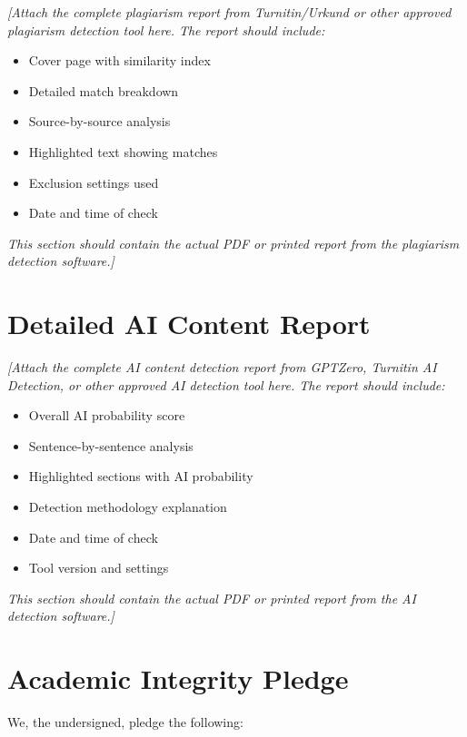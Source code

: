 \textit{[Attach the complete plagiarism report from Turnitin/Urkund or other approved plagiarism detection tool here. The report should include:}

\begin{itemize}
    \item Cover page with similarity index
    \item Detailed match breakdown
    \item Source-by-source analysis
    \item Highlighted text showing matches
    \item Exclusion settings used
    \item Date and time of check
\end{itemize}

\textit{This section should contain the actual PDF or printed report from the plagiarism detection software.]}

\newpage

\section{Detailed AI Content Report}

\textit{[Attach the complete AI content detection report from GPTZero, Turnitin AI Detection, or other approved AI detection tool here. The report should include:}

\begin{itemize}
    \item Overall AI probability score
    \item Sentence-by-sentence analysis
    \item Highlighted sections with AI probability
    \item Detection methodology explanation
    \item Date and time of check
    \item Tool version and settings
\end{itemize}

\textit{This section should contain the actual PDF or printed report from the AI detection software.]}

\newpage

\section{Academic Integrity Pledge}

We, the undersigned, pledge the following:

